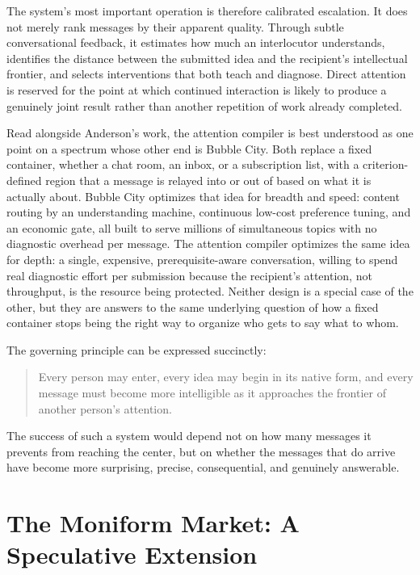 \documentclass[11pt]{article}
\begin{document}
The system's most important operation is therefore calibrated escalation. It does not merely rank messages by their apparent quality. Through subtle conversational feedback, it estimates how much an interlocutor understands, identifies the distance between the submitted idea and the recipient's intellectual frontier, and selects interventions that both teach and diagnose. Direct attention is reserved for the point at which continued interaction is likely to produce a genuinely joint result rather than another repetition of work already completed.

Read alongside Anderson's work, the attention compiler is best understood as one point on a spectrum whose other end is Bubble City. Both replace a fixed container, whether a chat room, an inbox, or a subscription list, with a criterion-defined region that a message is relayed into or out of based on what it is actually about. Bubble City optimizes that idea for breadth and speed: content routing by an understanding machine, continuous low-cost preference tuning, and an economic gate, all built to serve millions of simultaneous topics with no diagnostic overhead per message. The attention compiler optimizes the same idea for depth: a single, expensive, prerequisite-aware conversation, willing to spend real diagnostic effort per submission because the recipient's attention, not throughput, is the resource being protected. Neither design is a special case of the other, but they are answers to the same underlying question of how a fixed container stops being the right way to organize who gets to say what to whom.

The governing principle can be expressed succinctly:

\begin{quote}
Every person may enter, every idea may begin in its native form, and every message must become more intelligible as it approaches the frontier of another person's attention.
\end{quote}

The success of such a system would depend not on how many messages it prevents from reaching the center, but on whether the messages that do arrive have become more surprising, precise, consequential, and genuinely answerable.

\appendix

\section{The Moniform Market: A Speculative Extension}
\end{document}
